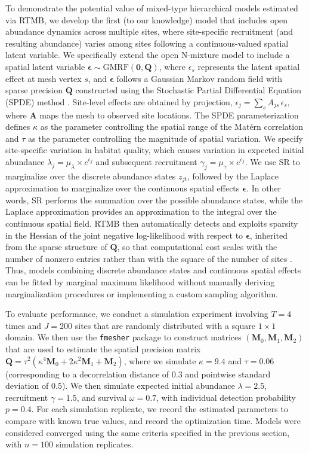 \documentclass[11pt]{article}
\newcommand{\vect}[1]{\bm{#1}}
\newcommand{\mat}[1]{\bm{#1}}
\begin{document}
To demonstrate the potential value of mixed-type hierarchical models estimated via RTMB, we develop the first (to our knowledge) model that includes open abundance dynamics across multiple sites, where site-specific recruitment (and resulting abundance) varies among sites following a continuous-valued spatial latent variable. We specifically extend the open N-mixture model to include a spatial latent variable $\vect{\epsilon} \sim \mathrm{GMRF}(\vect{0},\mat{Q})$, where $\epsilon_s$ represents the latent spatial effect at mesh vertex $s$, and $\vect{\epsilon}$ follows a Gaussian Markov random field with sparse precision $\mat{Q}$ constructed using the Stochastic Partial Differential Equation (SPDE) method \citep{lindgren_explicit_2011}. Site-level effects are obtained by projection, $\epsilon_j = \sum_s A_{js}\,\epsilon_s$, where $\mat{A}$ maps the mesh to observed site locations. The SPDE parameterization defines $\kappa$ as the parameter controlling the spatial range of the Matérn correlation and $\tau$ as the parameter controlling the magnitude of spatial variation. We specify site-specific variation in habitat quality, which causes variation in expected initial abundance $\lambda_j = \mu_{\lambda}\times e^{\epsilon_j}$ and subsequent recruitment $\gamma_j = \mu_{\gamma} \times e^{\epsilon_j}$. We use SR to marginalize over the discrete abundance states $z_{jt}$, followed by the Laplace approximation to marginalize over the continuous spatial effects $\vect{\epsilon}$. In other words, SR performs the summation over the possible abundance states, while the Laplace approximation provides an approximation to the integral over the continuous spatial field. RTMB then automatically detects and exploits sparsity in the Hessian of the joint negative log-likelihood with respect to $\vect{\epsilon}$, inherited from the sparse structure of $\mat{Q}$, so that computational cost scales with the number of nonzero entries rather than with the square of the number of sites \citep{lindgren_explicit_2011}. Thus, models combining discrete abundance states and continuous spatial effects can be fitted by marginal maximum likelihood without manually deriving marginalization procedures or implementing a custom sampling algorithm.

To evaluate performance, we conduct a simulation experiment involving $T=4$ times and $J=200$ sites that are randomly distributed with a square $1\times1$ domain. We then use the \texttt{fmesher} package \citep{lindgren_fmesher_2023} to construct matrices $\left( \mat{M}_0, \mat{M}_1, \mat{M}_2 \right)$ that are used to estimate the spatial precision matrix $\mat{Q} = \tau^2 \left( \kappa^4 \mat{M}_0 + 2\kappa^2 \mat{M}_1 + \mat{M}_2 \right)$, where we simulate $\kappa = 9.4$ and $\tau = 0.06$ (corresponding to a decorrelation distance of $0.3$ and pointwise standard deviation of $0.5$). We then simulate expected initial abundance $\lambda=2.5$, recruitment $\gamma=1.5$, and survival $\omega=0.7$, with individual detection probability $p=0.4$. For each simulation replicate, we record the estimated parameters to compare with known true values, and record the optimization time. Models were considered converged using the same criteria specified in the previous section, with $n=100$ simulation replicates.
\end{document}
